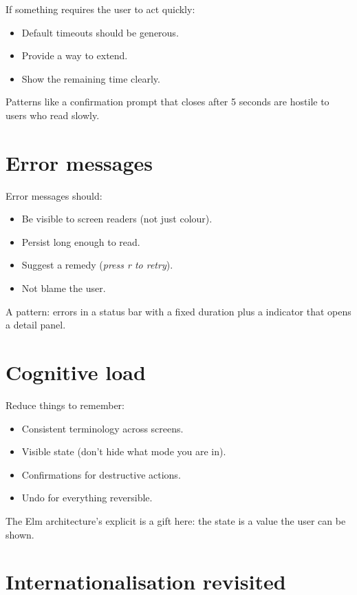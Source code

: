 If something requires the user to act quickly:

\begin{itemize}[leftmargin=*]
  \item Default timeouts should be generous.
  \item Provide a way to extend.
  \item Show the remaining time clearly.
\end{itemize}

Patterns like a confirmation prompt that closes after 5 seconds
are hostile to users who read slowly.

\section{Error messages}

Error messages should:

\begin{itemize}[leftmargin=*]
  \item Be visible to screen readers (not just colour).
  \item Persist long enough to read.
  \item Suggest a remedy (\emph{press r to retry}).
  \item Not blame the user.
\end{itemize}

A pattern: errors in a status bar with a fixed duration plus a
\code{[?]} indicator that opens a detail panel.

\section{Cognitive load}

Reduce things to remember:

\begin{itemize}[leftmargin=*]
  \item Consistent terminology across screens.
  \item Visible state (don't hide what mode you are in).
  \item Confirmations for destructive actions.
  \item Undo for everything reversible.
\end{itemize}

The Elm architecture's explicit  is a gift here:
the state is a value the user can be shown.

\section{Internationalisation revisited}

